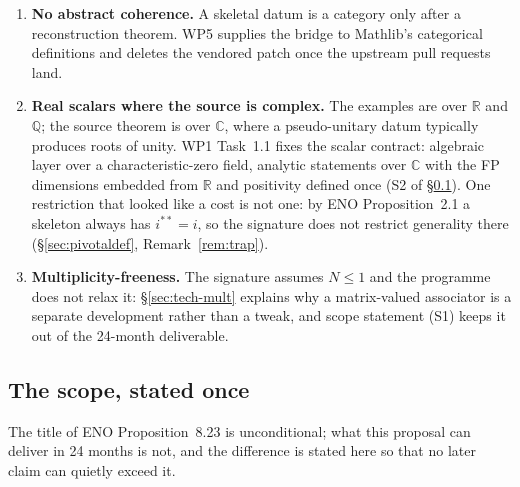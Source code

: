 \documentclass[11pt,a4paper]{article}
\theoremstyle{remark}
\newcommand{\R}{\mathbb{R}}
\newcommand{\Cx}{\mathbb{C}}
\newcommand{\Q}{\mathbb{Q}}
\begin{document}
\begin{enumerate}[label=(\roman*)]
\item \textbf{No abstract coherence.} A skeletal datum is a category only after a reconstruction
theorem. WP5 supplies the bridge to Mathlib's categorical definitions and deletes the vendored
patch once the upstream pull requests land.
\item \textbf{Real scalars where the source is complex.} The examples are over $\R$ and $\Q$; the
source theorem is over $\Cx$, where a pseudo-unitary datum typically produces roots of unity.
WP1 Task~1.1 fixes the scalar contract: algebraic layer over a characteristic-zero field,
analytic statements over $\Cx$ with the FP dimensions embedded from $\R$ and positivity defined
once (S2 of \S\ref{sec:scope}). One restriction that looked like a cost is not one: by ENO
Proposition~2.1 a skeleton always has $i^{**} = i$, so the signature does not restrict
generality there (\S\ref{sec:pivotaldef}, Remark~\ref{rem:trap}).
\item \textbf{Multiplicity-freeness.} The signature assumes $N \le 1$ and the programme does not
relax it: \S\ref{sec:tech-mult} explains why a matrix-valued associator is a separate development
rather than a tweak, and scope statement (S1) keeps it out of the 24-month deliverable.
\end{enumerate}
\subsection{The scope, stated once}\label{sec:scope}

The title of ENO Proposition~8.23 is unconditional; what this proposal can deliver in 24 months
is not, and the difference is stated here so that no later claim can quietly exceed it.
\end{document}
